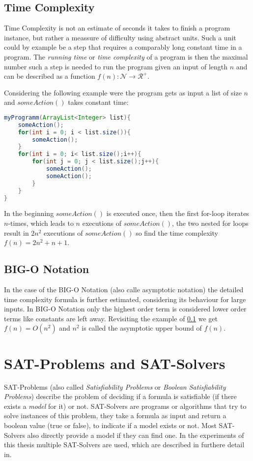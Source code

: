 \subsection{Time Complexity}\label{TimeComplexity}
 Time Complexity is not an estimate of seconds it takes to finish a program instance, but rather a meassure of difficulty using
 abstract units. Such a unit could by example be a step that requires a comparably long constant time in a program. The \emph{running time} or \emph{time complexity} of a program is then the maximal number such a step is needed to run the program given an input of length $n$ and can be described as a function $f(n): \mathcal{N} \rightarrow \mathcal{R}^+$. 

Considering the following example were the program gets as input a list of size $n$ and $someAction()$ takes constant time:
\lstset{basicstyle=\ttfamily}
\begin{lstlisting}[language=java,frame=single]
myProgramm(ArrayList<Integer> list){
    someAction();
    for(int i = 0; i < list.size()){
        someAction();
    }
    for(int i = 0; i< list.size();i++){
        for(int j = 0; j < list.size();j++){
            someAction();
            someAction();
        }
    }
}
\end{lstlisting}
In the beginning $someAction()$ is executed once, then the first for-loop iterates $n$-times, which leads to $n$ executions of $someAction()$, the two nested for loops result in $2n^2$ executions of $someAction()$ so find the time complexity $f(n)=2n^2+n+1$.

\subsection{BIG-O Notation}
In the case of the BIG-O Notation (also calle asymptotic notation) the detailed time complexity formula is further estimated, considering its behaviour for large inputs. In BIG-O Notation only the highest order term is considered lower order terms like constants are left away. Revisiting the example of \ref{TimeComplexity} we get $f(n) = O(n^2)$ and $n^2$ is called the asymptotic upper bound of $f(n)$.

\newpage
\section{SAT-Problems and SAT-Solvers}
SAT-Problems (also called \emph{Satisfiability Problems} or \emph{Boolean Satisfiability Problems}) describe the problem of deciding if a formula is satisfiable (if there exists a \emph{model} for it) or not. SAT-Solvers are programs or algorithms that try to solve instances of this problem, they take a formula as input and return a boolean value (true or false), to indicate if a model exists or not. Most SAT-Solvers also directly provide a model if they can find one. In the experiments of this thesis multiple SAT-Solvers are used, which are described in furthere detail in.

